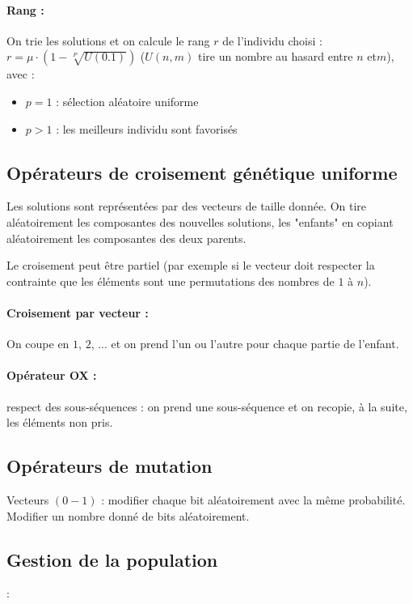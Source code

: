 \documentclass[11pt,a4paper]{report}
\begin{document}
\paragraph*{Rang : } On trie les solutions et on calcule le rang $r$ de l'individu choisi : $r = \mu \cdot (1-\sqrt[P]{U(0.1)})$ ($U(n,m)$ tire un nombre au hasard entre $n$ et$m$), avec :
\begin{itemize}
    \item $p=1$ : sélection aléatoire uniforme
    \item $p>1$ : les meilleurs individu sont favorisés
\end{itemize}

\subsection{Opérateurs de croisement génétique uniforme}
Les solutions sont représentées par des vecteurs de taille donnée. On tire aléatoirement les composantes des nouvelles solutions, les "enfants" en copiant aléatoirement les composantes des deux parents.

Le croisement peut être partiel (par exemple si le vecteur doit respecter la contrainte que les éléments sont une permutations des nombres de $1$ à $n$).

\paragraph*{Croisement par vecteur : } On coupe en $1$, $2$, ... et on prend l'un ou l'autre pour chaque partie de l'enfant.

\paragraph*{Opérateur OX : } respect des sous-séquences : on prend une sous-séquence et on recopie, à la suite, les éléments non pris.

\subsection{Opérateurs de mutation}
Vecteurs $(0-1)$ : modifier chaque bit aléatoirement avec la même probabilité. Modifier un nombre donné de bits aléatoirement.

\subsection{Gestion de la population}:
\end{document}
